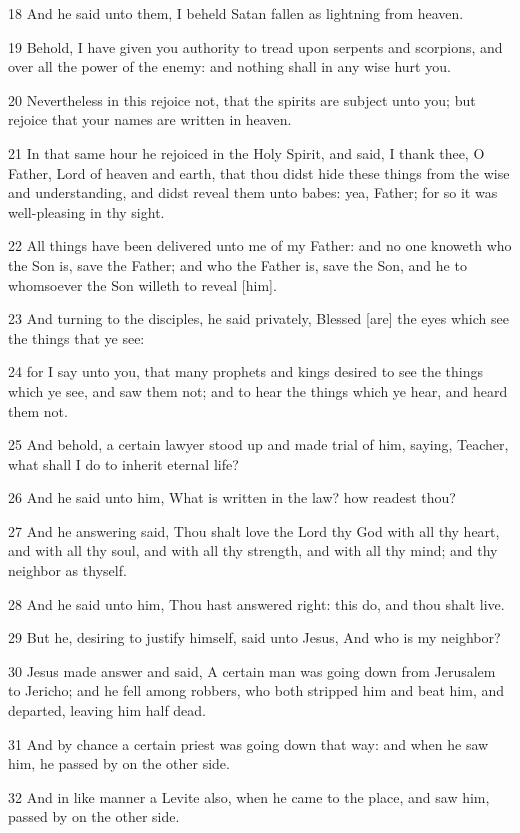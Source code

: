 \par 18 And he said unto them, I beheld Satan fallen as lightning from heaven.
\par 19 Behold, I have given you authority to tread upon serpents and scorpions, and over all the power of the enemy: and nothing shall in any wise hurt you.
\par 20 Nevertheless in this rejoice not, that the spirits are subject unto you; but rejoice that your names are written in heaven.
\par 21 In that same hour he rejoiced in the Holy Spirit, and said, I thank thee, O Father, Lord of heaven and earth, that thou didst hide these things from the wise and understanding, and didst reveal them unto babes: yea, Father; for so it was well-pleasing in thy sight.
\par 22 All things have been delivered unto me of my Father: and no one knoweth who the Son is, save the Father; and who the Father is, save the Son, and he to whomsoever the Son willeth to reveal [him].
\par 23 And turning to the disciples, he said privately, Blessed [are] the eyes which see the things that ye see:
\par 24 for I say unto you, that many prophets and kings desired to see the things which ye see, and saw them not; and to hear the things which ye hear, and heard them not.
\par 25 And behold, a certain lawyer stood up and made trial of him, saying, Teacher, what shall I do to inherit eternal life?
\par 26 And he said unto him, What is written in the law? how readest thou?
\par 27 And he answering said, Thou shalt love the Lord thy God with all thy heart, and with all thy soul, and with all thy strength, and with all thy mind; and thy neighbor as thyself.
\par 28 And he said unto him, Thou hast answered right: this do, and thou shalt live.
\par 29 But he, desiring to justify himself, said unto Jesus, And who is my neighbor?
\par 30 Jesus made answer and said, A certain man was going down from Jerusalem to Jericho; and he fell among robbers, who both stripped him and beat him, and departed, leaving him half dead.
\par 31 And by chance a certain priest was going down that way: and when he saw him, he passed by on the other side.
\par 32 And in like manner a Levite also, when he came to the place, and saw him, passed by on the other side.
